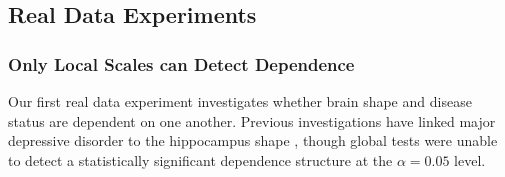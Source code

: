 \documentclass[11pt]{article}
\providecommand{\sct}[1]{{\sc \texttt{#1}}}
\newcommand{\subfigimg}[3][,]{%
  \setbox1=\hbox{\texttt{[image: \#3]}}%
  \leavevmode\rlap{\usebox1}%
  \rlap{\hspace*{12pt}\raisebox{\dimexpr\ht1-0\baselineskip}{#2}}%
  \phantom{\usebox1}%
}
\newcommand{\Mgc}{\sct{Mgc}}
\newcommand{\Mcorr}{\sct{Mcorr}}
\begin{document}

\subsection*{Real Data Experiments}
\label{numer3}

\subsubsection*{Only Local Scales can Detect Dependence} %

Our first real data experiment investigates whether brain shape and disease status are  dependent on one another.  Previous investigations have linked major depressive disorder to the hippocampus shape \cite{ParkEtAl2008,PosenerEtAl2003}, though global tests were unable to detect a statistically significant dependence structure at the $\alpha=0.05$ level.
\end{document}
